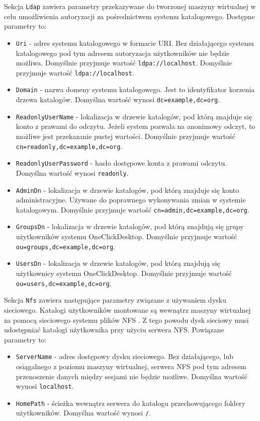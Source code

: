 \documentclass[../opis-rozwiazania.tex]{subfiles}
\begin{document}
Sekcja \texttt{Ldap} zawiera parametry przekazywane do tworzonej maszyny wirtualnej w celu umożliwienia autoryzacji za pośrednictwem systemu katalogowego. Dostępne parametry to:
\begin{itemize}
	\item \texttt{Uri} - adres systemu katalogowego w formacie URI. Bez działającego systemu katalogowego pod tym adresem autoryzacja użytkowników nie będzie możliwa. Domyślnie przyjmuje wartość \texttt{ldpa://localhost}. Domyślnie przyjmuje wartość \texttt{ldpa://localhost}.
	\item \texttt{Domain} - nazwa domeny systemu katalogowego. Jest to identyfikator korzenia drzewa katalogów. Domyślna wartość wynosi \texttt{dc=example,dc=org}.
	\item \texttt{ReadonlyUserName} - lokalizacja w drzewie katalogów, pod którą znajduje się konto z prawami do odczytu. Jeżeli system pozwala na anonimowy odczyt, to możliwe jest przekazanie pustej wartości. Domyślnie przyjmuje wartość \texttt{cn=readonly,dc=example,dc=org}.
	\item \texttt{ReadonlyUserPassword} - hasło dostępowe konta z prawami odczytu. Domyślna wartość wynosi \texttt{readonly}.
	\item \texttt{AdminDn} - lokalizacja w drzewie katalogów, pod którą znajduje się konto administracyjne. Używane do poprawnego wykonywania zmian w systemie katalogowym. Domyślnie przyjmuje wartość \texttt{cn=admin,dc=example,dc=org}.
	\item \texttt{GroupsDn} - lokalizacja w drzewie katalogów, pod którą znajdują się grupy użytkowników systemu OneClickDesktop. Domyślnie przyjmuje wartość \texttt{ou=groups,dc=example,dc=org}.
	\item \texttt{UsersDn} - lokalizacja w drzewie katalogów, pod którą znajdują się użytkownicy systemu OneClickDesktop. Domyślnie przyjmuje wartość \texttt{ou=users,dc=example,dc=org}.
\end{itemize}

Sekcja \texttt{Nfs} zawiera następujące parametry związane z używaniem dysku sieciowego. Katalogi użytkowników montowane są wewnątrz maszyny wirtualnej za pomocą sieciowego systemu plików NFS \parencite{nfs}. Z tego powodu dysk sieciowy musi udostępniać katalogi użytkownika przy użyciu serwera NFS. Powiązane parametry to:
\begin{itemize}
	\item \texttt{ServerName} - adres dostępowy dysku sieciowego. Bez działającego, lub osiągalnego z poziomu maszyny wirtualnej, serwera NFS pod tym adresem przenoszenie danych między sesjami nie będzie możliwe. Domyślna wartość wynosi \texttt{localhost}.
	\item \texttt{HomePath} - ścieżka wewnątrz serwera do katalogu przechowującego foldery użytkowników. Domyślna wartość wynosi \texttt{/}.
\end{itemize}
\end{document}
